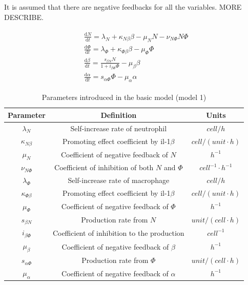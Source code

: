\documentclass[12pt,a4paper]{report}
\begin{document}
It is assumed that there are negative feedbacks for all the variables. MORE DESCRIBE.

\begin{align}
    \label{eq:model1}
    \begin{split}
        &\frac{\mathrm{d} N}{\mathrm{d} t}=\lambda_N+\kappa_{N\beta}\beta-\mu_NN-\nu_{N\Phi}N\Phi\\
        &\frac{\mathrm{d} \Phi}{\mathrm{d} t}=\lambda_\Phi+\kappa_{\Phi\beta}\beta-\mu_\Phi\Phi\\
        &\frac{\mathrm{d} \beta}{\mathrm{d} t}=\frac{s_{\beta N}N}{1+i_{\beta\Phi}\Phi}-\mu_\beta\beta\\
        &\frac{\mathrm{d} \alpha}{\mathrm{d} t}=s_{\alpha\Phi}\Phi-\mu_\alpha\alpha
    \end{split}
\end{align}

\begin{table}[h!]
\centering
\begin{tabular}{|c c c|} 
 \hline
 Parameter & Definition & Units\\ [0.5ex] 
 \hline\hline
 $\lambda_N$ & Self-increase rate of neutrophil & $cell/h$  \\ 
 $\kappa_{N\beta}$ & Promoting effect coefficient by il-1$\beta$ & $cell/(unit\cdotp h)$\\
 $\mu_N$ & Coefficient of negative feedback of $N$ & $h^{-1}$ \\
 $\nu_{N\Phi}$ & Coefficient of inhibition of both $N$ and $\Phi$& $cell^{-1}\cdotp h^{-1}$ \\
 \hline
 $\lambda_\Phi$ & Self-increase rate of macrophage & $cell/h$ \\
 $\kappa_{\Phi\beta}$ & Promoting effect coefficient by il-1$\beta$ & $cell/(unit\cdotp h)$ \\
 $\mu_\Phi$ &  Coefficient of negative feedback of $\Phi$ & $h^{-1}$ \\
 \hline
 $s_{\beta N}$ & Production rate from $N$ & $unit/(cell\cdotp h)$ \\
 $i_{\beta\Phi}$ & Coefficient of inhibition to the production & $cell^{-1}$ \\
 $\mu_\beta$ & Coefficient of negative feedback of $\beta$ & $h^{-1}$ \\
 \hline
 $s_{\alpha\Phi}$ & Production rate from $\Phi$ & $unit/(cell\cdotp h)$ \\
 $\mu_\alpha$ & Coefficient of negative feedback of $\alpha$ & $h^{-1}$ \\
[1ex] 
 \hline
\end{tabular}
\caption{Parameters introduced in the basic model (model 1)}
\label{table:m1}
\end{table}
\end{document}
